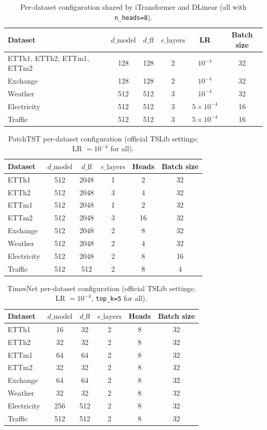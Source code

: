 \begin{table}[t]
\caption{Per-dataset configuration shared by iTransformer and DLinear (all with \texttt{n\_heads=8}).}
\label{tab:hp_family}
\centering\small
\begin{tabular}{lccccc}
\toprule
Dataset & $d\_{\mathrm{model}}$ & $d\_{\mathrm{ff}}$ & $e\_{\mathrm{layers}}$ & LR & Batch size \\
\midrule
ETTh1, ETTh2, ETTm1, ETTm2 & 128 & 128 & 2 & $10^{-4}$ & 32 \\
Exchange & 128 & 128 & 2 & $10^{-4}$ & 32 \\
Weather & 512 & 512 & 3 & $10^{-4}$ & 32 \\
Electricity & 512 & 512 & 3 & $5{\times}10^{-4}$ & 16 \\
Traffic & 512 & 512 & 3 & $5{\times}10^{-4}$ & 16 \\
\bottomrule
\end{tabular}
\end{table}

\begin{table}[t]
\caption{PatchTST per-dataset configuration (official TSLib settings; LR $=10^{-4}$ for all).}
\label{tab:hp_patchtst}
\centering\small
\begin{tabular}{lccccc}
\toprule
Dataset & $d\_{\mathrm{model}}$ & $d\_{\mathrm{ff}}$ & $e\_{\mathrm{layers}}$ & Heads & Batch size \\
\midrule
ETTh1 & 512 & 2048 & 1 & 2 & 32 \\
ETTh2 & 512 & 2048 & 3 & 4 & 32 \\
ETTm1 & 512 & 2048 & 1 & 2 & 32 \\
ETTm2 & 512 & 2048 & 3 & 16 & 32 \\
Exchange & 512 & 2048 & 2 & 8 & 32 \\
Weather & 512 & 2048 & 2 & 4 & 32 \\
Electricity & 512 & 2048 & 2 & 8 & 16 \\
Traffic & 512 & 512 & 2 & 8 & 4 \\
\bottomrule
\end{tabular}
\end{table}

\begin{table}[t]
\caption{TimesNet per-dataset configuration (official TSLib settings; LR $=10^{-4}$, \texttt{top\_k=5} for all).}
\label{tab:hp_timesnet}
\centering\small
\begin{tabular}{lccccc}
\toprule
Dataset & $d\_{\mathrm{model}}$ & $d\_{\mathrm{ff}}$ & $e\_{\mathrm{layers}}$ & Heads & Batch size \\
\midrule
ETTh1 & 16 & 32 & 2 & 8 & 32 \\
ETTh2 & 32 & 32 & 2 & 8 & 32 \\
ETTm1 & 64 & 64 & 2 & 8 & 32 \\
ETTm2 & 32 & 32 & 2 & 8 & 32 \\
Exchange & 64 & 64 & 2 & 8 & 32 \\
Weather & 32 & 32 & 2 & 8 & 32 \\
Electricity & 256 & 512 & 2 & 8 & 32 \\
Traffic & 512 & 512 & 2 & 8 & 32 \\
\bottomrule
\end{tabular}
\end{table}
